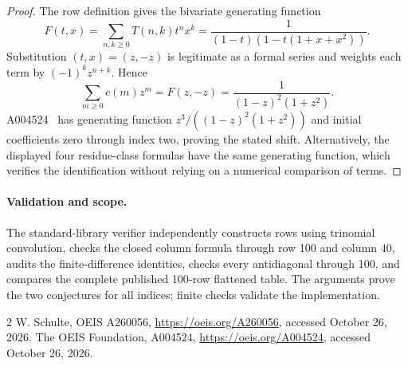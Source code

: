 \documentclass[10pt]{article}
\begin{document}
\begin{proof}
The row definition gives the bivariate generating function
\[
 F(t,x)=\sum_{n,k\ge0}T(n,k)t^nx^k
 =\frac1{(1-t)(1-t(1+x+x^2))}.
\]
Substitution $(t,x)=(z,-z)$ is legitimate as a formal series
and weights each term by $(-1)^kz^{n+k}$. Hence
\[
 \sum_{m\ge0}c(m)z^m=F(z,-z)
 =\frac1{(1-z)^2(1+z^2)}.
\]
A004524~\cite{comparison} has generating function
$z^3/((1-z)^2(1+z^2))$ and initial coefficients zero through
index two, proving the stated shift. Alternatively, the displayed
four residue-class formulas have the same generating function,
which verifies the identification without relying on a numerical
comparison of terms.
\end{proof}
\paragraph{Validation and scope.}
The standard-library verifier independently constructs rows using
trinomial convolution, checks the closed column formula through row
100 and column 40, audits the finite-difference identities, checks
every antidiagonal through 100, and compares the complete published
100-row flattened table. The arguments prove the two conjectures
for all indices; finite checks validate the implementation.
\begin{thebibliography}{2}
 W. Schulte, OEIS A260056,
\url{https://oeis.org/A260056}, accessed October 26, 2026.
 The OEIS Foundation, A004524,
\url{https://oeis.org/A004524}, accessed October 26, 2026.
\end{thebibliography}
\end{document}
